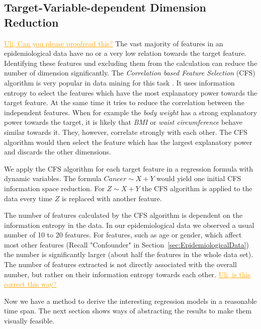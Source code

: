 \documentclass[journal]{style/vgtc} 			          %
\newcommand{\com}[1]{\textcolor{orange}{\uline{#1}}}
\begin{document}
\subsection{Target-Variable-dependent Dimension Reduction}
\com{Uli, Can you please proofread this?}
The vast majority of features in an epidemiological data have no or a very low relation towards the target feature.
Identifying these features und excluding them from the calculation can reduce the number of dimension significantly.
The \emph{Correlation based Feature Selection} (CFS) algorithm is very popular in data mining for this task \cite{CFS}.
It uses information entropy to select the features which have the most explanatory power towards the target feature.
At the same time it tries to reduce the correlation between the independent features.
When for example the \emph{body weight} has a strong explanatory power towards the target, it is likely that \emph{BMI} or \emph{waist circumference} behave similar towards it.
They, however, correlate strongly with each other.
The CFS algorithm would then select the feature which has the largest explanatory power and discards the other dimensions.

We apply the CFS algorithm for each target feature in a regression formula with dynamic variables.
The formula $Cancer \sim X + Y$ would yield one initial CFS information space reduction.
For $Z \sim X + Y$ the CFS algorithm is applied to the data every time $Z$ is replaced with another feature.

The number of features calculated by the CFS algorithm is dependent on the information entropy in the data.
In our epidemiological data we observed a usual number of 10 to 20 features.
For features, such as age or gender, which affect most other features (Recall "Confounder" in Section~\ref{sec:EpidemiologicalData}) the number is significantly larger (about half the features in the whole data set).
The number of features extracted is not directly associated with the overall number, but rather on their information entropy towards each other.
\com{Uli, is this correct this way?}

Now we have a method to derive the interesting regression models in a reasonable time span.
The next section shows ways of abstracting the results to make them visually feasible.
\end{document}
